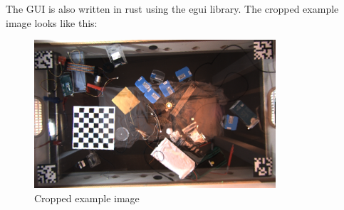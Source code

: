 The GUI is also written in rust using the egui\autocite{egui} library.
The cropped example image looks like this:
\begin{figure}[H]
    \centering
    \includegraphics[width=0.8\textwidth]{../photos/example8_cropped}
    \caption[croppedexampleimage]{Cropped example image}
    \label{fig:example8_cropped}
\end{figure}


